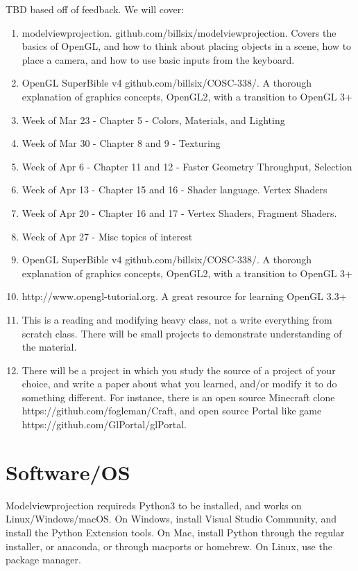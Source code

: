 \documentclass[11pt,twocolumn]{article}
\begin{document}
TBD based off of feedback.  We will cover:


\begin{enumerate}
\item{modelviewprojection. github.com/billsix/modelviewprojection.  Covers the basics of
  OpenGL, and how to think about placing objects in a scene, how to place a camera, and
how to use basic inputs from the keyboard.}
\item{OpenGL SuperBible v4 github.com/billsix/COSC-338/.  A thorough explanation of graphics
concepts, OpenGL2, with a transition to OpenGL 3+}
\item{Week of Mar 23 - Chapter 5 - Colors, Materials, and Lighting}
\item{Week of Mar 30 - Chapter 8 and 9 - Texturing}
\item{Week of Apr 6 - Chapter 11 and 12 - Faster Geometry Throughput, Selection}
\item{Week of Apr 13 - Chapter 15 and 16 - Shader language.  Vertex Shaders}
\item{Week of Apr 20 - Chapter 16 and 17 - Vertex Shaders, Fragment Shaders.}
\item{Week of Apr 27 - Misc topics of interest}
\item{OpenGL SuperBible v4 github.com/billsix/COSC-338/.  A thorough explanation of graphics
concepts, OpenGL2, with a transition to OpenGL 3+}
\item{http://www.opengl-tutorial.org. A great resource for learning OpenGL 3.3+}
\item{This is a reading and modifying heavy class, not a write everything from scratch class.
  There will be small projects to demonstrate understanding of the material.}
\item{There will be a project in which you study the source of a project of your choice,
  and write a paper about what you learned, and/or modify it to do something different.
  For instance, there is an open source Minecraft clone
  https://github.com/fogleman/Craft, and open source Portal like game https://github.com/GlPortal/glPortal.
  }

\end{enumerate}

\section{Software/OS}


Modelviewprojection requireds Python3 to be installed, and works on Linux/Windows/macOS.
On Windows, install Visual Studio Community, and install the Python Extension tools.
On Mac, install Python through the regular installer, or anaconda, or through macports or homebrew.
On Linux, use the package manager.
\end{document}
